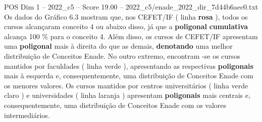 \begin{textsample}{POS Dim 1 – 2022\_c5 – Score 19.00 – 2022\_c5/enade\_2022\_dir\_7d44b6aec0.txt}
Os dados do Gráfico 6.3 mostram que, nos CEFET/IF ( linha \textbf{rosa} ), todos os cursos alcançaram conceito 4 ou abaixo disso, já que a \textbf{poligonal} \textbf{cumulativa} alcança 100 \% para o conceito 4.
Além disso, os cursos de CEFET/IF apresentam uma \textbf{poligonal} mais à direita do que as demais, \textbf{denotando} uma melhor distribuição de Conceitos Enade.
No outro extremo, encontram -se os cursos mantidos por faculdades ( linha verde ), apresentando as respectivas \textbf{poligonais} mais à esquerda e, consequentemente, uma distribuição de Conceitos Enade com os menores valores.
Os cursos mantidos por centros universitários ( linha verde claro ) e universidades ( linha laranja ) apresentam \textbf{poligonais} mais centrais e, consequentemente, uma distribuição de Conceitos Enade com os valores intermediários.

\end{textsample}
